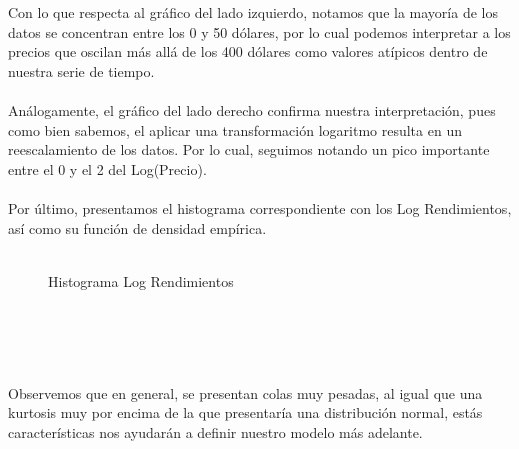 Con lo que respecta al gráfico del lado izquierdo, notamos que la mayoría de los datos se concentran entre los 0 y 50 dólares, por lo cual podemos interpretar a los precios que oscilan más allá de los 400 dólares como valores atípicos dentro de nuestra serie de tiempo.
\\\\
Análogamente, el gráfico del lado derecho confirma nuestra interpretación, pues como bien sabemos, el aplicar una transformación logaritmo resulta en un reescalamiento de los datos. Por lo cual, seguimos notando un pico importante entre el 0 y el 2 del Log(Precio). 
\\\\
\newpage
Por último, presentamos el histograma correspondiente con los Log Rendimientos, así como su función de densidad empírica.
\\\\
\begin{figure}[htbp]
    \centering
    \vspace{10mm}
    \caption{Histograma Log Rendimientos} 
    \label{Histogramas Log Rendimientos.}
\end{figure}
\\\\
\\\\
Observemos que en general, se presentan colas muy pesadas, al igual que una kurtosis muy por encima de la que presentaría una distribución normal, estás características nos ayudarán a definir nuestro modelo más adelante.    





